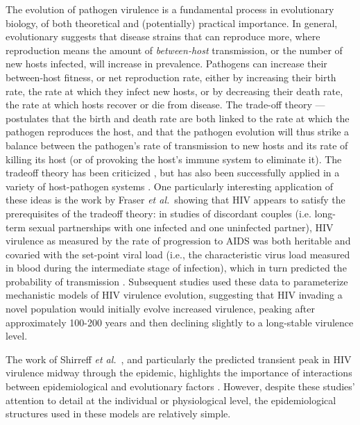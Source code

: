 \documentclass[10pt,letterpaper]{article}
\newcommand{\etal}{\textit{et al.}}
\begin{document}
The evolution of pathogen virulence is a fundamental process in
evolutionary biology, of both theoretical and (potentially) practical
importance. In general, evolutionary suggests that
disease strains that can reproduce more, where reproduction
means the amount of \emph{between-host} transmission, or
the number of new hosts infected, will increase in prevalence.
Pathogens can increase their between-host 
fitness, or net reproduction rate, either
by increasing their birth rate, the rate at which they
infect new hosts, or by decreasing their death rate, the rate
at which hosts recover or die from disease.
The trade-off theory \cite{Ebert1999} --- postulates that
the birth and death rate are both linked to the rate at which
the pathogen reproduces the host, and that the pathogen
evolution will thus strike a balance between the
pathogen's rate of transmission
to new hosts and its rate of killing its host (or of provoking
the host's immune system to eliminate it).
The tradeoff theory has been criticized
\cite{EbertBull2003,alizon_adaptive_2015}, but has also been
successfully applied in a variety of host-pathogen systems \cite{Dwyer+1990,mackinnon1999genetic,jensen2006empirical,deroode2008virulence}. One
particularly interesting application of these ideas is the work by
Fraser \etal\ showing that HIV appears to satisfy the prerequisites of
the tradeoff theory: in studies of discordant couples (i.e. long-term
sexual partnerships with one infected and one uninfected partner), HIV
virulence as measured by the rate of progression to AIDS was both
heritable and covaried with the set-point viral load (i.e., the
characteristic virus load measured in blood during the intermediate
stage of infection), which in turn predicted the probability of
transmission
\cite{Fraser+2007,fraser_virulence_2014}. Subsequent studies
\cite{shirreff_transmission_2011,herbeck_hiv_2014} used these data to
parameterize mechanistic models of HIV virulence evolution, suggesting
that HIV invading a novel population would initially evolve increased
virulence, peaking after approximately 100-200 years and then declining
slightly to a long-stable virulence level.

The work of Shirreff \etal\ \cite{shirreff_transmission_2011}, and particularly the predicted
transient peak in HIV virulence midway through the epidemic,
highlights the importance of interactions between epidemiological and
evolutionary factors \cite{day_virulence_2004,alizon_price_2009}.
However, despite these studies' attention to detail at the individual
or physiological level, the epidemiological structures used in these
models are relatively simple.
\end{document}
